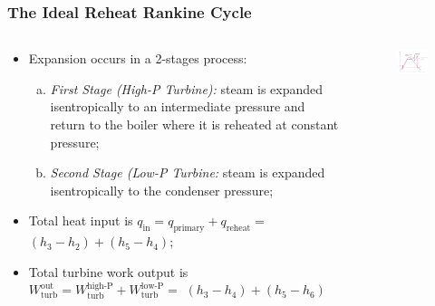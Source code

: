 \documentclass[10pt,compress,handout,ignorenonframetext]{beamer}
\begin{document}
\begin{frame}
 \frametitle{The Ideal Reheat Rankine Cycle}
  \begin{columns}
   \begin{column}[c]{0.5\linewidth}

 \begin{itemize} %
  \item <1-> Expansion occurs in a 2-stages process:
  \begin{enumerate}[(a)] %
   \item <2-> {\it First Stage (High-P Turbine):} steam is expanded isentropically to an intermediate pressure and return to the boiler where it is reheated at constant pressure;
   \item <3-> {\it Second Stage (Low-P Turbine:} steam is expanded isentropically to the condenser pressure;
  \end{enumerate}
  \item <4-> Total heat input is $q_{\text{in}}=q_{\text{primary}}+q_{\text{reheat}}=$$\left(h_{3}-h_{2}\right)+\left(h_{5}-h_{4}\right)$;
  \item <5-> Total turbine work output is $W_{\text{turb}}^{\text{out}} = W_{\text{turb}}^{\text{high-P}} + W_{\text{turb}}^{\text{low-P}}=$ $\left(h_{3}-h_{4}\right)+\left(h_{5}-h_{6}\right)$
 \end{itemize} 
   \end{column}

   \begin{column}[c]{0.5\linewidth} 
    \begin{figure}%
     \begin{center}
      \includegraphics[width=6.25cm,clip]{./Pics/Reheat_Rankine_Cycle_Diagram}
     \end{center}
    \end{figure}  
   \end{column}
  \end{columns}

 \normalsize
\end{frame}
\end{document}
